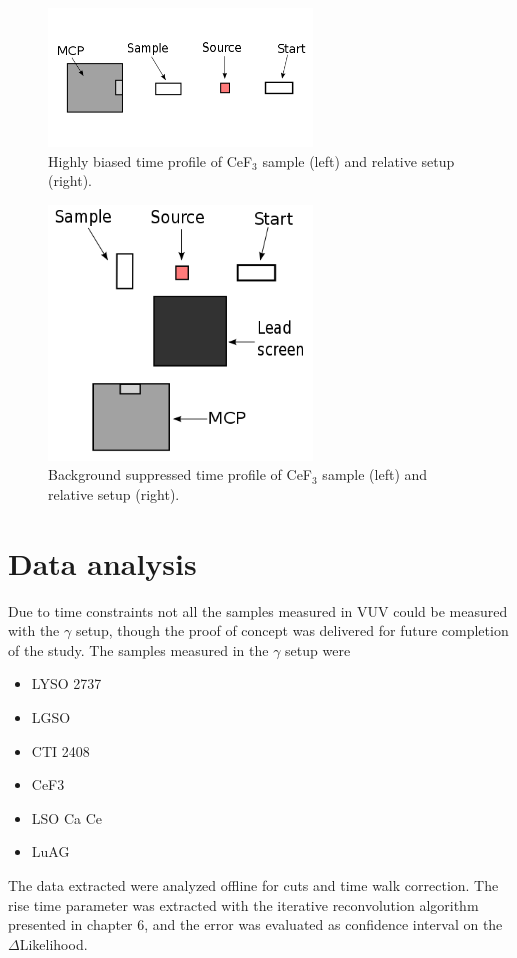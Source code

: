 \begin{figure}
\begin{center}
\includegraphics[width=7cm]{../Pictures/Chapter_8/setup_direct.png}
\end{center}
\caption[Background biased measurement]{Highly biased time profile of CeF$_{3}$ sample (left) and relative setup (right).}
\label{fig:twist2}
\end{figure}

\begin{figure}
\begin{center}
\includegraphics[width=7cm]{../Pictures/Chapter_8/setup_twist.png}
\end{center}
\caption[Background suppressed measurement]{Background suppressed time profile of CeF$_{3}$ sample (left) and relative setup (right).}
\label{fig:twist3}
\end{figure}

\section{Data analysis}
Due to time constraints not all the samples measured in VUV could be measured with the $\gamma$ setup, though the proof of concept was delivered for future completion of the study.
The samples measured in the $\gamma$ setup were
\begin{itemize}
\item LYSO 2737
\item LGSO
\item CTI 2408
\item CeF3
\item LSO Ca Ce
\item LuAG %
\end{itemize}
The data extracted were analyzed offline for cuts and time walk correction. 
The rise time parameter was extracted with the iterative reconvolution algorithm presented in chapter 6, and the error was evaluated as confidence interval on the $\Delta$Likelihood.

